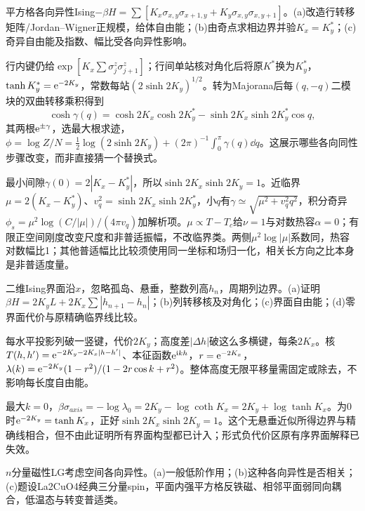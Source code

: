 \begin{exercise}[原题6(a)--(c)]\label{r:334-3-6}
平方格各向异性Ising$-\beta H=\sum[K_x\sigma_{x,y}\sigma_{x+1,y}+K_y\sigma_{x,y}\sigma_{x,y+1}]$。(a)改造行转移矩阵/Jordan--Wigner正规模，给体自由能；(b)由奇点求相边界并验$K_x=K_y^*$；(c)奇异自由能及指数、幅比受各向异性影响。
\end{exercise}
\begin{solution}
行内键仍给$\exp[K_x\sum\sigma^z_j\sigma^z_{j+1}]$；行间单站核对角化后将原$K^*$换为$K_y^*$，$\tanh K_y^*=\mathrm e^{-2K_y}$，常数每站$(2\sinh2K_y)^{1/2}$。转为Majorana后每$(q,-q)$二模块的双曲转移乘积得到
\begin{equation}
\cosh\gamma(q)=\cosh2K_x\cosh2K_y^*-\sinh2K_x\sinh2K_y^*\cos q,
\end{equation}
其两根$\mathrm e^{\pm\gamma}$，选最大根求迹，$\phi=\log Z/N=\tfrac12\log(2\sinh2K_y)+(2\pi)^{-1}\int_0^\pi\gamma(q)\dd q$。这展示哪些各向同性步骤改变，而非直接猜一个替换式。

最小间隙$\gamma(0)=2|K_x-K_y^*|$，所以$\sinh2K_x\sinh2K_y=1$。近临界$\mu=2(K_x-K_y^*)$、$v_q^2=\sinh2K_x\sinh2K_y^*$，小$q$有$\gamma\simeq\sqrt{\mu^2+v_q^2q^2}$，积分奇异$\phi_s=\mu^2\log(C/|\mu|)/(4\pi v_q)$加解析项。$\mu\propto T-T_c$给$\nu=1$与对数热容$\alpha=0$；有限正空间刚度改变尺度和非普适振幅，不改临界类。两侧$\mu^2\log|\mu|$系数同，热容对数幅比1；其他普适幅比比较须使用同一坐标和场归一化，相关长方向之比本身是非普适度量。
\end{solution}
\begin{exercise}[原题7(a)--(d)]\label{r:334-3-7}
二维Ising界面沿$x$，忽略孤岛、悬垂，整数列高$h_n$，周期列边界。(a)证明$\beta H=2K_yL+2K_x\sum|h_{n+1}-h_n|$；(b)列转移核及对角化；(c)界面自由能；(d)零界面代价与原精确临界线比较。
\end{exercise}
\begin{solution}
每水平投影列破一竖键，代价$2K_y$；高度差$|\Delta h|$破这么多横键，每条$2K_x$。核$T(h,h')=\mathrm e^{-2K_y-2K_x|h-h'|}$、本征函数$\mathrm e^{\mathrm i kh}$，$r=\mathrm e^{-2K_x}$，$\lambda(k)=\mathrm e^{-2K_y}(1-r^2)/(1-2r\cos k+r^2)$。整体高度无限平移量需固定或除去，不影响每长度自由能。

最大$k=0$，$\beta\sigma_{axis}=-\log\lambda_0=2K_y-\log\coth K_x=2K_y+\log\tanh K_x$。为0时$\mathrm e^{-2K_y}=\tanh K_x$，正好$\sinh2K_x\sinh2K_y=1$。这个无悬垂近似所得边界与精确线相合，但不由此证明所有界面构型都已计入；形式负代价区原有序界面解释已失效。
\end{solution}
\begin{exercise}[原题8(a)--(c)]\label{r:334-3-8}
$n$分量磁性LG考虑空间各向异性。(a)一般低阶作用；(b)这种各向异性是否相关；(c)题设La2CuO4经典三分量spin，平面内强平方格反铁磁、相邻平面弱同向耦合，低温态与转变普适类。
\end{exercise}
